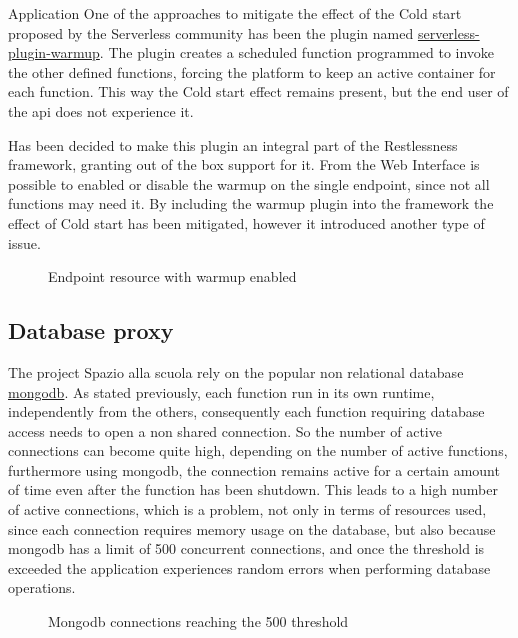 \begin{chapter}{Application}
    One of the approaches to mitigate the effect of the Cold start proposed by the
    Serverless community has been the plugin named
    \href{https://www.npmjs.com/package/serverless-plugin-warmup}{serverless-plugin-warmup}.
    The plugin creates a scheduled function programmed to invoke the other defined functions,
    forcing the platform to keep an active container for each function.
    This way the Cold start effect remains present, but the end user of the api does
    not experience it.

    Has been decided to make this plugin an integral part of the Restlessness framework,
    granting out of the box support for it. From the Web Interface is possible to
    enabled or disable the warmup on the single endpoint, since not all functions may
    need it.
    By including the warmup plugin into the framework the effect of Cold start has
    been mitigated, however it introduced another type of issue.
    \begin{figure}
        \centering
        \caption{Endpoint resource with warmup enabled}
        \label{fig:wi_endpoint_warmup}
    \end{figure}

    \subsection{Database proxy}
    The project Spazio alla scuola rely on the popular non relational database
    \href{https://www.mongodb.com}{mongodb}. As stated previously, each function
    run in its own runtime, independently from the others, consequently each function
    requiring database access needs to open a non shared connection.
    So the number of active connections can become quite high, depending on the number
    of active functions, furthermore using mongodb, the connection remains active for
    a certain amount of time even after the function has been shutdown.
    This leads to a high number of active connections, which is a problem, not only
    in terms of resources used, since each connection requires memory usage on the
    database, but also because mongodb has a limit of 500 concurrent connections,
    and once the threshold is exceeded the application experiences random errors when
    performing database operations.
    \begin{figure}
        \centering
        \caption{Mongodb connections reaching the 500 threshold}
    \end{figure}


\end{chapter}

